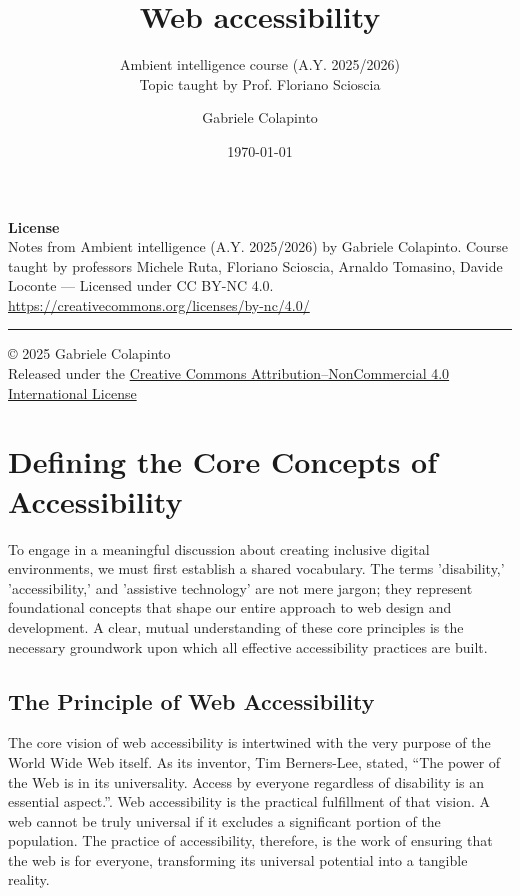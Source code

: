 \documentclass{scrbook}
\title{Web accessibility}
\subtitle{Ambient intelligence course (A.Y. 2025/2026)\\Topic taught by Prof. Floriano Scioscia}
\author{Gabriele Colapinto}
\date{\today}
\begin{document}
\maketitle
\thispagestyle{empty}

{\Large\textbf{License}} \\
{Notes from Ambient intelligence (A.Y. 2025/2026) by Gabriele Colapinto. 
Course taught by professors Michele Ruta, Floriano Scioscia, Arnaldo Tomasino, Davide Loconte — 
Licensed under CC BY-NC 4.0.\\
\url{https://creativecommons.org/licenses/by-nc/4.0/}}

\vspace*{\fill}
\rule{\textwidth}{0.2pt}
\small{© 2025 Gabriele Colapinto \\
Released under the \href{https://creativecommons.org/licenses/by-nc/4.0/}{Creative Commons Attribution–NonCommercial 4.0 International License}}

\clearpage

\tableofcontents

\chapter{Defining the Core Concepts of Accessibility}

To engage in a meaningful discussion about creating inclusive digital environments, we must first establish a shared vocabulary. The terms 'disability,' 'accessibility,' and 'assistive technology' are not mere jargon; they represent foundational concepts that shape our entire approach to web design and development. A clear, mutual understanding of these core principles is the necessary groundwork upon which all effective accessibility practices are built.

\section{The Principle of Web Accessibility}

The core vision of web accessibility is intertwined with the very purpose of the World Wide Web itself. As its inventor, Tim Berners-Lee, stated, “The power of the Web is in its universality. Access by everyone regardless of disability is an essential aspect.”. Web accessibility is the practical fulfillment of that vision. A web cannot be truly universal if it excludes a significant portion of the population. The practice of accessibility, therefore, is the work of ensuring that the web is for everyone, transforming its universal potential into a tangible reality.
\end{document}
